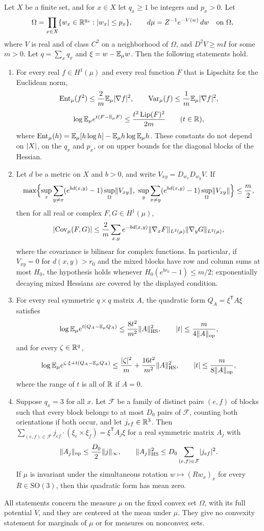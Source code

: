 \begin{theorem}\label{ch02:thm:reflecting-concentration}
Let $X$ be a finite set, and for $x\in X$ let $q_x\ge1$ be integers and $p_x>0$. Let
\[
 \Omega=\prod_{x\in X}\{w_x\in\mathbb R^{q_x}:\lvert w_x\rvert\le p_x\},\qquad
 d\mu=Z^{-1}e^{-V(w)}\,dw\quad\text{on }\Omega,
\]
where $V$ is real and of class $C^2$ on a neighborhood of $\Omega$, and $D^2V\ge mI$ for some $m>0$. Let $q=\sum_xq_x$ and $\xi=w-\mathbb E_\mu w$. Then the following statements hold.
\begin{enumerate}
\item For every real $f\in H^1(\mu)$ and every real function $F$ that is Lipschitz for the Euclidean norm,
\[
 \operatorname{Ent}_\mu(f^2)\le\frac2m\mathbb E_\mu\lvert \nabla f\rvert^2,\qquad
 \operatorname{Var}_\mu(f)\le\frac1m\mathbb E_\mu\lvert \nabla f\rvert^2,
\]
\[
 \log\mathbb E_\mu e^{t(F-\mathbb E_\mu F)}\le\frac{t^2\operatorname{Lip}(F)^2}{2m}\qquad(t\in\mathbb R),
\]
where $\operatorname{Ent}_\mu(h)=\mathbb E_\mu[h\log h]-\mathbb E_\mu h\log\mathbb E_\mu h$. These constants do not depend on $\lvert X\rvert$, on the $q_x$ and $p_x$, or on upper bounds for the diagonal blocks of the Hessian.
\item Let $d$ be a metric on $X$ and $b>0$, and write $V_{xy}=D_{w_x}D_{w_y}V$. If
\[
 \max\Bigl\{\sup_x\sum_{y\ne x}(e^{bd(x,y)}-1)\sup_\Omega\lVert V_{xy}\rVert,\ \sup_y\sum_{x\ne y}(e^{bd(x,y)}-1)\sup_\Omega\lVert V_{xy}\rVert\Bigr\}\le\frac m2,
\]
then for all real or complex $F,G\in H^1(\mu)$,
\[
 \lvert \operatorname{Cov}_\mu(F,G)\rvert\le\frac2m\sum_{x,y}e^{-bd(x,y)}\lVert \nabla_xF\rVert_{L^2(\mu)}\lVert \nabla_yG\rVert_{L^2(\mu)},
\]
where the covariance is bilinear for complex functions. In particular, if $V_{xy}=0$ for $d(x,y)>r_0$ and the mixed blocks have row and column sums at most $H_0$, the hypothesis holds whenever $H_0(e^{br_0}-1)\le m/2$; exponentially decaying mixed Hessians are covered by the displayed condition.
\item For every real symmetric $q\times q$ matrix $A$, the quadratic form $Q_A=\xi^{\mathsf T}A\xi$ satisfies
\[
 \log\mathbb E_\mu e^{t(Q_A-\mathbb E_\mu Q_A)}\le\frac{8t^2}{m^2}\lVert A\rVert_{\mathrm{HS}}^2,\qquad\lvert t\rvert\le\frac m{4\lVert A\rVert_{\mathrm{op}}},
\]
and for every $\zeta\in\mathbb R^q$,
\[
 \log\mathbb E_\mu e^{\zeta\cdot\xi+t(Q_A-\mathbb E_\mu Q_A)}\le\frac{\lvert \zeta\rvert^2}m+\frac{16t^2}{m^2}\lVert A\rVert_{\mathrm{HS}}^2,\qquad\lvert t\rvert\le\frac m{8\lVert A\rVert_{\mathrm{op}}},
\]
where the range of $t$ is all of $\mathbb R$ if $A=0$.
\item Suppose $q_x=3$ for all $x$. Let $\mathcal F$ be a family of distinct pairs $(e,f)$ of blocks such that every block belongs to at most $D_0$ pairs of $\mathcal F$, counting both orientations if both occur, and let $j_{ef}\in\mathbb R^3$. Then $\sum_{(e,f)\in\mathcal F}j_{ef}\cdot(\xi_e\times\xi_f)=\xi^{\mathsf T}A_j\xi$ for a real symmetric matrix $A_j$ with
\[
 \lVert A_j\rVert_{\mathrm{op}}\le\frac{D_0}2\lVert j\rVert_\infty,\qquad
 \lVert A_j\rVert_{\mathrm{HS}}^2\le D_0\sum_{(e,f)\in\mathcal F}\lvert j_{ef}\rvert^2.
\]
If $\mu$ is invariant under the simultaneous rotation $w\mapsto(Rw_x)_x$ for every $R\in\mathrm{SO}(3)$, then this quadratic form has mean zero.
\end{enumerate}
All statements concern the measure $\mu$ on the fixed convex set $\Omega$, with its full potential $V$, and they are centered at the mean under $\mu$. They give no convexity statement for marginals of $\mu$ or for measures on nonconvex sets.
\end{theorem}

